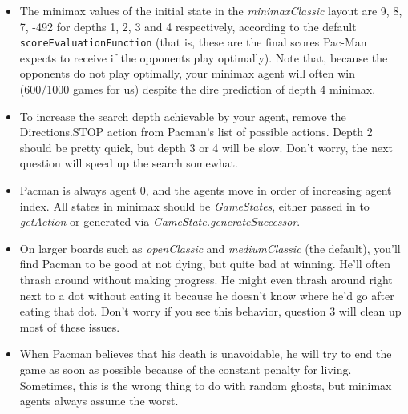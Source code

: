 \documentclass{article}
\begin{document}
\begin{itemize}

\item The minimax values of the initial state in the \emph{minimaxClassic} layout are 9, 8, 7, -492 for depths 1, 2, 3 and 4 respectively, according to the default \texttt{scoreEvaluationFunction} (that is, these are the final scores Pac-Man expects to receive if the opponents play optimally). Note that, because the opponents do not play optimally, your minimax agent will often win (600/1000 games for us) despite the dire prediction of depth 4 minimax.

\item To increase the search depth achievable by your agent, remove the Directions.STOP action from Pacman's list of possible actions. Depth 2 should be pretty quick, but depth 3 or 4 will be slow. Don't worry, the next question will speed up the search somewhat.

\item Pacman is always agent 0, and the agents move in order of increasing agent index.
All states in minimax should be \emph{GameStates}, either passed in to \emph{getAction} or generated via \emph{GameState.generateSuccessor}.

\item On larger boards such as \emph{openClassic} and \emph{mediumClassic} (the default), you'll find Pacman to be good at not dying, but quite bad at winning. He'll often thrash around without making progress. He might even thrash around right next to a dot without eating it because he doesn't know where he'd go after eating that dot. Don't worry if you see this behavior, question 3 will clean up most of these issues.

\item When Pacman believes that his death is unavoidable, he will try to end the game as soon as possible because of the constant penalty for living. Sometimes, this is the wrong thing to do with random ghosts, but minimax agents always assume the worst. 


%


\end{itemize}
\end{document}
